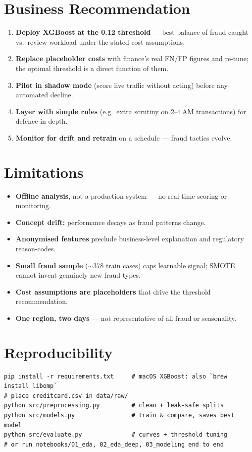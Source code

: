 \documentclass[11pt,a4paper]{article}
\begin{document}
\section{Business Recommendation}
\begin{enumerate}[leftmargin=1.5em]
  \item \textbf{Deploy XGBoost at the 0.12 threshold} --- best balance of fraud
        caught vs.\ review workload under the stated cost assumptions.
  \item \textbf{Replace placeholder costs} with finance's real FN/FP figures and
        re-tune; the optimal threshold is a direct function of them.
  \item \textbf{Pilot in shadow mode} (score live traffic without acting) before
        any automated decline.
  \item \textbf{Layer with simple rules} (e.g.\ extra scrutiny on 2--4\,AM
        transactions) for defence in depth.
  \item \textbf{Monitor for drift and retrain} on a schedule --- fraud tactics
        evolve.
\end{enumerate}

\section{Limitations}
\begin{itemize}[leftmargin=1.4em]
  \item \textbf{Offline analysis}, not a production system --- no real-time scoring
        or monitoring.
  \item \textbf{Concept drift:} performance decays as fraud patterns change.
  \item \textbf{Anonymised features} preclude business-level explanation and
        regulatory reason-codes.
  \item \textbf{Small fraud sample} ($\sim$378 train cases) caps learnable signal;
        SMOTE cannot invent genuinely new fraud types.
  \item \textbf{Cost assumptions are placeholders} that drive the threshold
        recommendation.
  \item \textbf{One region, two days} --- not representative of all fraud or
        seasonality.
\end{itemize}

\section{Reproducibility}
\begin{verbatim}
pip install -r requirements.txt     # macOS XGBoost: also `brew install libomp`
# place creditcard.csv in data/raw/
python src/preprocessing.py         # clean + leak-safe splits
python src/models.py                # train & compare, saves best model
python src/evaluate.py              # curves + threshold tuning
# or run notebooks/01_eda, 02_eda_deep, 03_modeling end to end
\end{verbatim}
\end{document}
